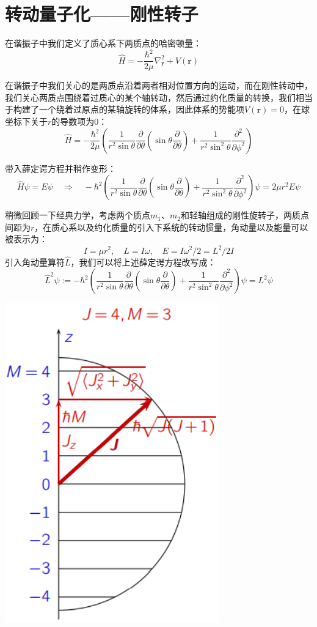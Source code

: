 \section{转动量子化——刚性转子}
在谐振子中我们定义了质心系下两质点的哈密顿量：
\[\hat{H}=-\frac{\hbar^2}{2\mu}\nabla^2_{\bm{r}}+V(\bm{r})\]

在谐振子中我们关心的是两质点沿着两者相对位置方向的运动，而在刚性转动中，我们关心两质点围绕着过质心的某个轴转动，然后通过约化质量的转换，我们相当于构建了一个绕着过原点的某轴旋转的体系，因此体系的势能项$V(\bm{r})=0$，在球坐标下关于$r$的导数项为0：
\[\hat{H}=-\frac{\hbar^2}{2\mu} \left(\frac{1}{r^2\sin\theta}\frac{\partial}{\partial{\theta}}(\sin\theta\frac{\partial}{\partial{\theta}})+\frac{1}{r^2\sin^2 \theta }\frac{\partial^2}{\partial{\phi^2}} \right)\]

带入薛定谔方程并稍作变形：
\[\hat{H}\psi=E\psi \quad \Rightarrow \quad -\hbar^2\left(\frac{1}{r^2\sin\theta}\frac{\partial}{\partial{\theta}}(\sin\theta\frac{\partial}{\partial{\theta}})+\frac{1}{r^2\sin^2 \theta }\frac{\partial^2}{\partial{\phi^2}} \right)\psi=2\mu r^2 E\psi\]

稍微回顾一下经典力学，考虑两个质点$m_1$、$m_2$和轻轴组成的刚性旋转子，两质点间距为$r$，在质心系以及约化质量的引入下系统的转动惯量，角动量以及能量可以被表示为：
\[I=\mu r^2, \quad L=I\omega, \quad E=I\omega^2/2=L^2/2I\]
引入角动量算符$\hat{L}$，我们可以将上述薛定谔方程改写成：
\[\hat{L}^2\psi:=-\hbar^2\left(\frac{1}{r^2\sin\theta}\frac{\partial}{\partial{\theta}}(\sin\theta\frac{\partial}{\partial{\theta}})+\frac{1}{r^2\sin^2 \theta }\frac{\partial^2}{\partial{\phi^2}} \right)\psi=L^2\psi\]
 
\begin{center}
    \includegraphics[scale=0.5]{fig/lzhx/微信图片_20211026130340.png}
\end{center}

